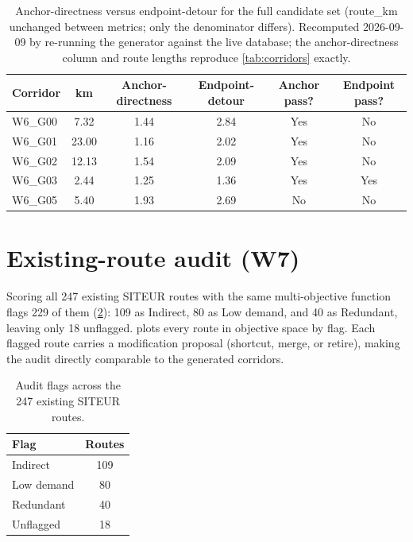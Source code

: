 \begin{table}[htbp]
\centering
\caption{Anchor-directness versus endpoint-detour for the full candidate set
  (route\_km unchanged between metrics; only the denominator differs).
  Recomputed 2026-09-09 by re-running the generator against the live database;
  the anchor-directness column and route lengths reproduce
  \cref{tab:corridors} exactly.}
\label{tab:directness-comparison}
\begin{tabular}{l S[table-format=2.2] S[table-format=1.2] S[table-format=1.2] c c}
\toprule
Corridor & {km} & {Anchor-directness} & {Endpoint-detour} & Anchor pass? & Endpoint pass? \\
\midrule
W6\_G00 & 7.32  & 1.44 & 2.84 & Yes & No \\
W6\_G01 & 23.00 & 1.16 & 2.02 & Yes & No \\
W6\_G02 & 12.13 & 1.54 & 2.09 & Yes & No \\
W6\_G03 & 2.44  & 1.25 & 1.36 & Yes & Yes \\
W6\_G05 & 5.40  & 1.93 & 2.69 & No  & No \\
\bottomrule
\end{tabular}
\end{table}

\section{Existing-route audit (W7)}
\label{sec:res-w7}

Scoring all \num{247} existing SITEUR routes with the same multi-objective function
flags \num{229} of them (\cref{tab:audit}): \num{109} as Indirect, \num{80} as Low
demand, and \num{40} as Redundant, leaving only \num{18} unflagged.
 plots every route in objective space by flag. Each flagged route
carries a modification proposal (shortcut, merge, or retire), making the audit
directly comparable to the generated corridors.

\begin{table}[htbp]
\centering
\caption{Audit flags across the \num{247} existing SITEUR routes.}
\label{tab:audit}
\begin{tabular}{lS[table-format=3.0]}
\toprule
Flag & {Routes} \\
\midrule
Indirect   & 109 \\
Low demand & 80 \\
Redundant  & 40 \\
Unflagged  & 18 \\
\bottomrule
\end{tabular}
\end{table}

